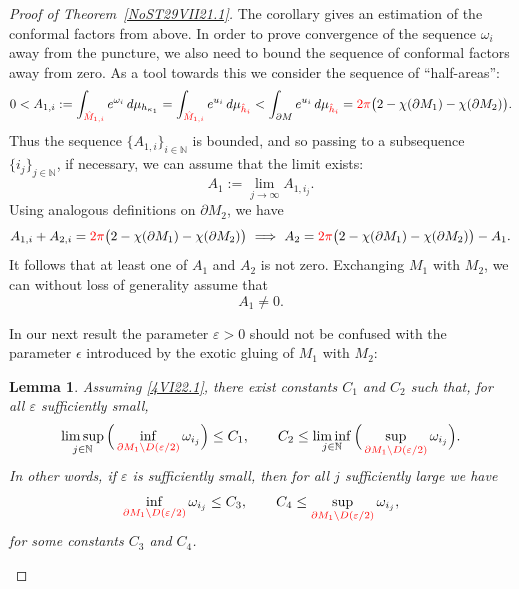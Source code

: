 \documentclass[10pt,a4paper]{article}
\numberwithin{equation}{section}
\newtheorem{Lemma}[Theorem]{Lemma}
\newcommand{\hhi}{{\red{\hat h_{i}}}}
\newcommand{\mv}{\omega}%
\newcommand{\N}{\mathbb N}
\newcommand{\red}[1]{{\color{red}#1}}
\newcommand{\repsilon}{ {\varepsilon}}
\newcommand{\zMone}{\red{{\hat M}_{1,i}}}
\begin{document}
\begin{proof}[Proof of Theorem~\ref{NoST29VII21.1}]
The corollary gives an estimation of the conformal factors from above. In order to prove convergence of the sequence $\mv_i$ away from the puncture, we also need to bound the sequence of conformal factors away from zero. As a tool towards this we
consider the sequence of ``half-areas'':
\begin{equation*}%
 0 < A_{1,i}:=\int_{\zMone } {\rm e}^{\mv_i} \,{\rm d}\mu_{h_{\kappa_1}} =
 \int_{\zMone } {\rm e}^{u_i} \,{\rm d}\mu_{\hhi }
 <
 \int_{\partial M } {\rm e}^{u_i} \,{\rm d}\mu_{\hhi }
 = \red{2\pi}
 \big(
 2-\chi(\partial M_1) - \chi(\partial M_2)
 \big).
\end{equation*}
Thus the sequence $\{A_{1,i}\}_{i\in \N}$ is bounded, and so passing to a subsequence $\{i_j\}_{j\in \N}$, if necessary, we can assume that the limit exists:
\begin{equation*}%
 A_{1}:= \lim_{j\to\infty} A_{1,i_j}.
\end{equation*}
Using analogous definitions on $\partial M_2$, we have
\begin{equation*}%
 A_{1,i} + A_{2,i} = \red{2\pi}
 \big(
 2-\chi(\partial M_1) - \chi(\partial M_2)
 \big)
 \
 \Longrightarrow
 \
 A_2 = \red{2\pi}
 \big(
 2-\chi(\partial M_1) - \chi(\partial M_2)
 \big) - A_1.
\end{equation*}
It follows that at least one of $A_1$ and $A_2$ is not zero. Exchanging $M_1$ with $M_2$, we can without loss of generality assume that
\begin{equation}\label{4VI22.1}
 A_1 \ne 0.
\end{equation}

In our next result the parameter $\repsilon>0$ should not be confused with the parameter $\epsilon$ introduced by the exotic gluing of $M_1$ with $M_2$:

\begin{Lemma}\label{NoSL23X21.1}Assuming \eqref{4VI22.1}, there exist constants $C_1$ and $C_2$ such that, for all $\repsilon$ sufficiently small,
\begin{equation*}%
 \limsup_{j\in \N}
 \Big(
 \inf_{\red{\partial M_1 \setminus D(\repsilon/2)}} \mv_{i_j}
 \Big)
 \le C_1,
 \qquad
 C_2\le
 \liminf_{j\in\N}
 \Big(
 \sup_{\red{\partial M_1 \setminus D(\repsilon/2)}} \mv_{i_j}
 \Big).
\end{equation*}
In other words, if $\repsilon$ is sufficiently small, then for all $j$ sufficiently large we have
\begin{equation}\label{NoS15VIII21.21b}
 \inf_{\red{\partial M_1 \setminus D(\repsilon/2)}} \mv_{i_j}
 \le C_3,
 \qquad
 C_4\le
 \sup_{\red{\partial M_1 \setminus D(\repsilon/2)}} \mv_{i_j},
\end{equation}
for some constants $C_3$ and $C_4$.
\end{Lemma}


\end{proof}
\end{document}
